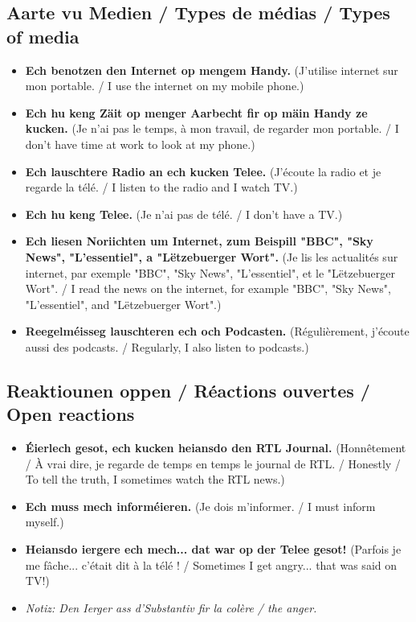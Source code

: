 \subsection{Aarte vu Medien / Types de médias / Types of media}
\begin{itemize}
    \item \textbf{Ech benotzen den Internet op mengem Handy.} (J'utilise internet sur mon portable. / I use the internet on my mobile phone.)
    \item \textbf{Ech hu keng Zäit op menger Aarbecht fir op mäin Handy ze kucken.} (Je n'ai pas le temps, à mon travail, de regarder mon portable. / I don't have time at work to look at my phone.)
    \item \textbf{Ech lauschtere Radio an ech kucken Telee.} (J'écoute la radio et je regarde la télé. / I listen to the radio and I watch TV.)
    \item \textbf{Ech hu keng Telee.} (Je n'ai pas de télé. / I don't have a TV.)
    \item \textbf{Ech liesen Noriichten um Internet, zum Beispill "BBC", "Sky News", "L'essentiel", a "Lëtzebuerger Wort".} (Je lis les actualités sur internet, par exemple "BBC", "Sky News", "L'essentiel", et le "Lëtzebuerger Wort". / I read the news on the internet, for example "BBC", "Sky News", "L'essentiel", and "Lëtzebuerger Wort".)
    \item \textbf{Reegelméisseg lauschteren ech och Podcasten.} (Régulièrement, j'écoute aussi des podcasts. / Regularly, I also listen to podcasts.)
\end{itemize}

\subsection{Reaktiounen oppen / Réactions ouvertes / Open reactions}
\begin{itemize}
    \item \textbf{Éierlech gesot, ech kucken heiansdo den RTL Journal.} (Honnêtement / À vrai dire, je regarde de temps en temps le journal de RTL. / Honestly / To tell the truth, I sometimes watch the RTL news.)
    \item \textbf{Ech muss mech informéieren.} (Je dois m'informer. / I must inform myself.)
    \item \textbf{Heiansdo iergere ech mech... dat war op der Telee gesot!} (Parfois je me fâche... c'était dit à la télé ! / Sometimes I get angry... that was said on TV!)
    \item \textit{Notiz: Den Ierger ass d'Substantiv fir la colère / the anger.}
\end{itemize}

